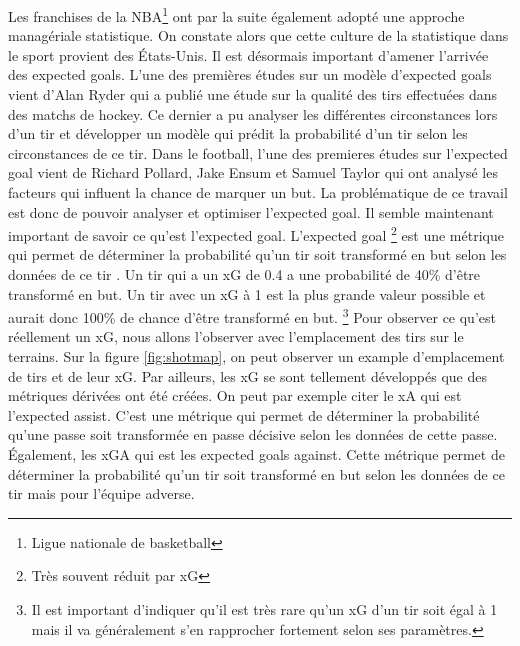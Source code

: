 \documentclass[12pt]{article}
\begin{document}
Les franchises de la NBA\footnote{Ligue nationale de basketball} ont par la suite également adopté une approche managériale statistique.
On constate alors que cette culture de la statistique dans le sport provient des États-Unis.
\newline
Il est désormais important d'amener l'arrivée des expected goals. L'une des premières études sur un modèle d'expected goals vient d'Alan Ryder qui a publié une étude sur la qualité des tirs effectuées dans des matchs de hockey. \cite{ryderIsolatingShotQuality2004}
Ce dernier a pu analyser les différentes circonstances lors d'un tir et développer un modèle qui prédit la probabilité d'un tir selon les circonstances de ce tir.
Dans le football, l'une des premieres études sur l'expected goal vient de Richard Pollard, Jake Ensum et Samuel Taylor qui ont analysé les facteurs qui influent la chance de marquer un but. \cite{pollardEstimatingProbabilityShot2004} La problématique de ce travail est donc de pouvoir analyser et optimiser l'expected goal.
\newline\newline
Il semble maintenant important de savoir ce qu'est l'expected goal. L'expected goal
\footnote{Très souvent réduit par xG} est une métrique qui permet de déterminer la probabilité qu'un tir soit transformé en but selon les données de ce tir \cite{XGExplainedFBrefa}.
Un tir qui a un xG de 0.4 a une probabilité de 40\% d'être transformé en but. Un tir avec un xG à 1 est la plus grande valeur possible et aurait donc 100\% de chance d'être transformé en but.
\footnote{Il est important d'indiquer qu'il est très rare qu'un xG d'un tir soit égal à 1 mais il va généralement s'en rapprocher fortement selon ses paramètres.} \cite{pettyWhatExpectedGoals2018a}
\newline\newline
Pour observer ce qu'est réellement un xG, nous allons l'observer avec l'emplacement des tirs sur le terrains.
Sur la figure \ref{fig:shotmap}, on peut observer un example d'emplacement de tirs et de leur xG.
\newline \newline
Par ailleurs, les xG se sont tellement développés que des métriques dérivées ont été créées. On peut par exemple citer le xA qui est l'expected assist. C'est une métrique qui permet de déterminer la probabilité qu'une passe soit transformée en passe décisive selon les données de cette passe. \cite{XGExplainedFBrefa}
Également, les xGA qui est les expected goals against. Cette métrique permet de déterminer la probabilité qu'un tir soit transformé en but selon les données de ce tir mais pour l'équipe adverse. \cite{pettyWhatExpectedGoals2018a}
\end{document}
